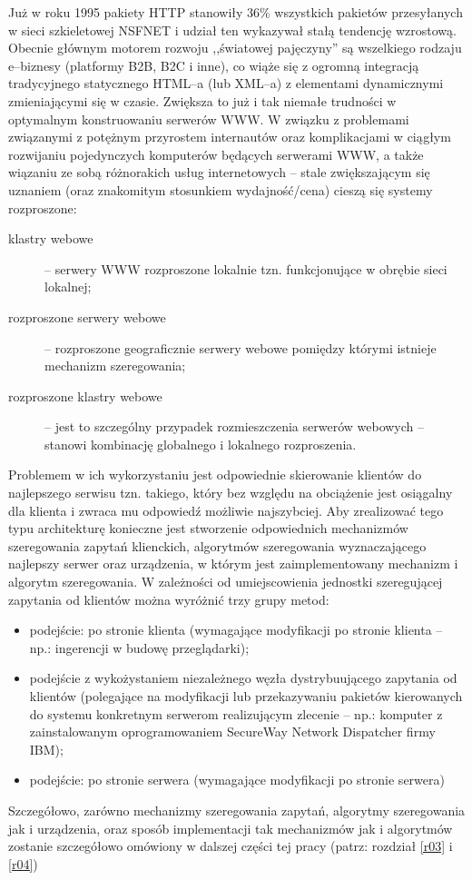 Już w roku 1995 pakiety HTTP stanowiły 36\% wszystkich pakietów przesyłanych w 
sieci szkieletowej NSFNET \cite{barylo2} i udział ten wykazywał stałą tendencję wzrostową. Obecnie głównym motorem rozwoju 
,,światowej pajęczyny'' są wszelkiego rodzaju e--biznesy (platformy B2B, B2C i inne), co wiąże się z ogromną 
integracją tradycyjnego statycznego HTML--a (lub XML--a) z elementami dynamicznymi zmieniającymi się w czasie. 
Zwiększa to już i tak niemałe trudności w optymalnym konstruowaniu serwerów WWW. W związku z problemami 
związanymi z potężnym przyrostem internautów oraz komplikacjami w ciągłym rozwijaniu pojedynczych komputerów 
będących serwerami WWW, a także wiązaniu ze sobą różnorakich usług internetowych -- stale zwiększającym się 
uznaniem (oraz znakomitym stosunkiem wydajność/cena) cieszą się systemy rozproszone: 
\begin{description}
\item[klastry webowe] -- serwery WWW rozproszone lokalnie tzn. funkcjonujące w obrębie sieci lokalnej;
\item[rozproszone serwery webowe] -- rozproszone geograficznie serwery webowe pomiędzy którymi istnieje mechanizm szeregowania;
\item[rozproszone klastry webowe] -- jest to szczególny przypadek rozmieszczenia serwerów webowych -- stanowi kombinację 
globalnego i lokalnego rozproszenia. 
\end{description}
Problemem w ich wykorzystaniu 
jest odpowiednie skierowanie klientów do najlepszego serwisu tzn. takiego, który bez względu na obciążenie jest osiągalny dla 
klienta i zwraca mu odpowiedź możliwie najszybciej. Aby zrealizować tego typu architekturę konieczne jest stworzenie
odpowiednich mechanizmów szeregowania zapytań klienckich, algorytmów szeregowania wyznaczającego najlepszy serwer oraz 
urządzenia, w którym jest zaimplementowany mechanizm i algorytm szeregowania. W zależności od umiejscowienia jednostki
szeregującej zapytania od klientów można wyróżnić trzy grupy metod:
\begin{itemize}
\item podejście: po stronie klienta (wymagające modyfikacji po stronie klienta -- np.: ingerencji w budowę przeglądarki);
\item podejście z wykożystaniem niezależnego węzła dystrybuującego zapytania od klientów (polegające na modyfikacji lub przekazywaniu
pakietów kierowanych do systemu konkretnym serwerom realizującym zlecenie -- np.: komputer z zainstalowanym oprogramowaniem SecureWay Network Dispatcher firmy IBM);
\item podejście: po stronie serwera (wymagające modyfikacji po stronie serwera)
\end{itemize}
Szczegółowo, zarówno mechanizmy szeregowania zapytań, algorytmy szeregowania jak i urządzenia, oraz sposób implementacji tak 
mechanizmów jak i algorytmów zostanie szczegółowo omówiony w dalszej części tej pracy (patrz: rozdział \ref{r03} i \ref{r04})

